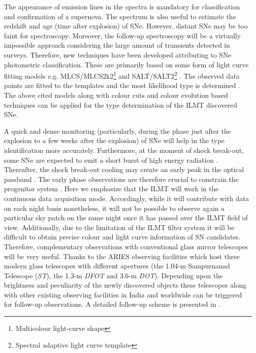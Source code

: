 \documentclass[useAMS,usenatbib]{mnras}
\begin{document}
The appearance of emission lines in the spectra is mandatory for classification and confirmation 
of a supernova. The spectrum is also useful to estimate the redshift and age (time after explosion) of 
SNe. However, distant SNe may be too faint for spectroscopy. Moreover, the follow-up spectroscopy 
will be a virtually impossible approach considering the large amount of transients detected in surveys. 
Therefore, new techniques have been developed attributing to SNe photometric classification.
These are primarily based on some form of light curve fitting models e.g.
MLCS/MLCS2k2\footnote{Multicolour light-curve shape} \citep{1995ApJ...438L..17R,2007ApJ...659..122J}
and SALT/SALT2\footnote{Spectral adaptive light curve template} \citep{2005A&A...443....1G,2007A&A...466...2G}.
%
The observed data points are fitted to the templates and the most likelihood type is determined
\citep[see, e.g.][]{2002PASP..114..833P,2007AJ....134.1285P,2004PASP..116..597G,2006AJ....131..960S,
2006AJ....132..756J,2007ApJ...659..530K,2007PhRvD..75j3508K,2009ApJ...707.1064R,2010ApJ...709.1420G,
2010ApJ...723..398F,2011ApJ...738..162S}. 
The above cited models along with colour cuts and colour evolution based techniques \citep[e.g.][]{2002PASP..114..284D,
2006AJ....132..756J} can be applied for the type determination of the ILMT discovered SNe.

A quick and dense monitoring (particularly, during the phase just after the explosion to a few weeks 
after the explosion) of SNe will help in the type identification more accurately. Furthermore, at the 
moment of shock break-out, some SNe are expected to emit a short burst of high energy radiation 
\citep{2010ApJ...725..904N}. Thereafter, the shock break-out cooling may create an early peak in the 
optical passband \citep{2013ApJ...769...67P}. The early phase observations are therefore crucial 
to constrain the progenitor system \citep{2012ApJ...757...31B,2015A&A...574A..60T}.  
%
Here we emphasize that the ILMT will work in the continuous data acquisition mode. 
Accordingly, while it will contribute with data on each night basis nonetheless,
it will not be possible to observe again a particular sky patch on the same night once it has passed
over the ILMT field of view. Additionally, due to the limitation of the ILMT filter system it will
be difficult to obtain precise colour and light curve information of SN candidates.
Therefore, complementary observations with conventional glass mirror telescopes will be very useful.
Thanks to the ARIES observing facilities which host three modern glass telescopes with different
apertures (the 1.04-m Sampurnanad Telescope ({\it ST}), the 1.3-m {\it DFOT} and 3.6-m {\it DOT}).
Depending upon the brightness and peculiarity of the newly discovered objects these telescopes along with 
other existing observing facilities in India and worldwide can be triggered for follow-up observations. 
A detailed follow-up scheme is presented in \citet{Kumar_bina}.
\end{document}

